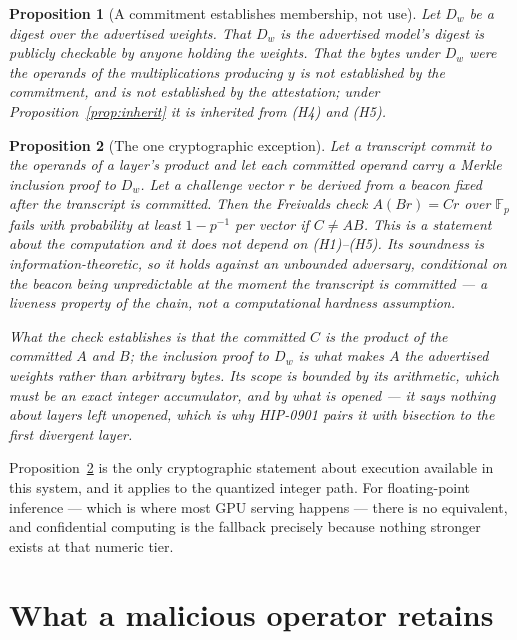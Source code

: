 \documentclass[11pt]{article}
\newtheorem{proposition}{Proposition}
\begin{document}
\begin{proposition}[A commitment establishes membership, not use]
\label{prop:commitment}
Let $D_w$ be a digest over the advertised weights. That $D_w$ is the advertised model's digest is
publicly checkable by anyone holding the weights. That the bytes under $D_w$ were the operands of
the multiplications producing $y$ is not established by the commitment, and is not established by
the attestation; under Proposition~\ref{prop:inherit} it is inherited from \textup{(H4)} and
\textup{(H5)}.
\end{proposition}

\begin{proposition}[The one cryptographic exception]
\label{prop:freivalds}
Let a transcript commit to the operands of a layer's product and let each committed operand carry a
Merkle inclusion proof to $D_w$. Let a challenge vector $r$ be derived from a beacon fixed after the
transcript is committed. Then the Freivalds check $A(Br) = Cr$ over $\mathbb{F}_p$ fails with
probability at least $1 - p^{-1}$ per vector if $C \neq AB$. This is a statement about the
computation and it does not depend on \textup{(H1)--(H5)}. Its soundness is information-theoretic,
so it holds against an unbounded adversary, conditional on the beacon being unpredictable at the
moment the transcript is committed --- a liveness property of the chain, not a computational
hardness assumption.

What the check establishes is that the committed $C$ is the product of the committed $A$ and $B$;
the inclusion proof to $D_w$ is what makes $A$ the advertised weights rather than arbitrary bytes.
Its scope is bounded by its arithmetic, which must be an exact integer accumulator, and by what is
opened --- it says nothing about layers left unopened, which is why HIP-0901 pairs it with bisection
to the first divergent layer.
\end{proposition}

Proposition~\ref{prop:freivalds} is the only cryptographic statement about execution available in
this system, and it applies to the quantized integer path. For floating-point inference --- which is
where most GPU serving happens --- there is no equivalent, and confidential computing is the
fallback precisely because nothing stronger exists at that numeric tier.

\section{What a malicious operator retains}
\label{sec:residual}
\end{document}
